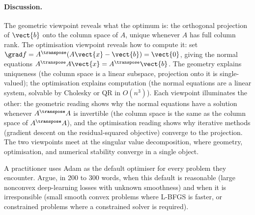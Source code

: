 \paragraph{Discussion.}
The geometric viewpoint reveals what the optimum is: the
orthogonal projection of $\vect{b}$ onto the column space of $A$,
unique whenever $A$ has full column rank. The optimisation
viewpoint reveals how to compute it: set $\grad f = A^{\transpose}
(A \vect{x} - \vect{b}) = \vect{0}$, giving the normal equations
$A^{\transpose} A \vect{x} = A^{\transpose} \vect{b}$. The
geometry explains uniqueness (the column space is a linear
subspace, projection onto it is single-valued); the optimisation
explains computation (the normal equations are a linear system,
solvable by Cholesky or QR in $O(n^{3})$). Each viewpoint
illuminates the other: the geometric reading shows why the normal
equations have a solution whenever $A^{\transpose} A$ is invertible
(the column space is the same as the column space of
$A^{\transpose} A$), and the optimisation reading shows why
iterative methods (gradient descent on the residual-squared
objective) converge to the projection. The two viewpoints meet at
the singular value decomposition, where geometry, optimisation,
and numerical stability converge in a single object.

\begin{exercise}
A practitioner uses Adam as the default optimiser for every
problem they encounter. Argue, in 200 to 300 words, when this
default is reasonable (large nonconvex deep-learning losses with
unknown smoothness) and when it is irresponsible (small smooth
convex problems where L-BFGS is faster, or constrained problems
where a constrained solver is required).
\end{exercise}


